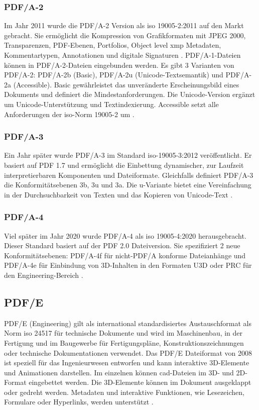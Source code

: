\subsubsection{PDF/A-2}
Im Jahr 2011 wurde die PDF/A-2 Version als \gls{iso} 19005-2:2011 auf den Markt gebracht. Sie ermöglicht die Kompression von Grafikformaten mit JPEG 2000, Transparenzen, PDF-Ebenen, Portfolios, Object level \gls{xmp} Metadaten, Kommentartypen, Annotationen und digitale Signaturen \cite{proj-consult}. PDF/A-1-Dateien können in PDF/A-2-Dateien eingebunden werden. Es gibt 3 Varianten von PDF/A-2: PDF/A-2b (Basic), PDF/A-2u (Unicode-Textsemantik) und PDF/A-2a (Accessible). Basic gewährleistet das unveränderte Erscheinungsbild eines Dokuments und definiert die Mindestanforderungen. Die Unicode-Version ergänzt um Unicode-Unterstützung und Textindexierung. Accessible setzt alle Anforderungen der \gls{iso}-Norm 19005-2 um \cite{adobe-pdf-a}. 

\subsubsection{PDF/A-3}
Ein Jahr später wurde PDF/A-3 im Standard \gls{iso}-19005-3:2012 veröffentlicht. Er basiert auf PDF 1.7 und ermöglicht die Einbettung dynamischer, zur Laufzeit interpretierbaren Komponenten und Dateiformate. Gleichfalls definiert PDF/A-3 die Konformitätsebenen 3b, 3u und 3a. Die u-Variante bietet eine Vereinfachung in der Durchsuchbarkeit von Texten und das Kopieren von Unicode-Text \cite{proj-consult}.

\subsubsection{PDF/A-4}
Viel später im Jahr 2020 wurde PDF/A-4 als \gls{iso} 19005-4:2020 herausgebracht. Dieser Standard basiert auf der PDF 2.0 Dateiversion. Sie spezifiziert 2 neue Konformitätsebenen: PDF/A-4f für nicht-PDF/A konforme Dateianhänge und PDF/A-4e für Einbindung von 3D-Inhalten in den Formaten U3D oder PRC für den Engineering-Bereich \cite{proj-consult}.

\subsection{PDF/E}
PDF/E (Engineering) gilt als international standardisiertes Austauschformat als Norm \gls{iso} 24517 für technische Dokumente und wird im Maschinenbau, in der Fertigung und im Baugewerbe für Fertigungspläne, Konstruktionszeichnungen oder technische Dokumentationen verwendet. Das PDF/E Dateiformat von 2008 ist speziell für das Ingenieurwesen entworfen und kann interaktive 3D-Elemente und Animationen darstellen. Im einzelnen können \gls{cad}-Dateien im 3D- und 2D-Format eingebettet werden. Die 3D-Elemente können im Dokument ausgeklappt oder gedreht werden. Metadaten und interaktive Funktionen, wie Lesezeichen, Formulare oder Hyperlinks, werden unterstützt \cite{adobe-pdf-e}.

